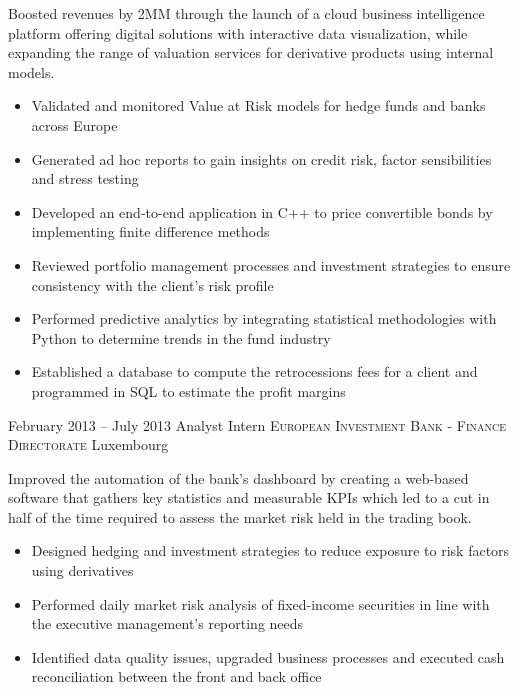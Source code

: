 \documentclass[11pt,a4paper,sans]{moderncv}
\begin{document}
	{
	Boosted revenues by 2MM through the launch of a cloud business intelligence platform offering digital solutions with interactive data visualization, while expanding the range of valuation services for derivative products using internal models.
	\vspace{1mm}
	\begin{itemize}
		\item Validated and monitored Value at Risk models for hedge funds and banks across Europe
		\item Generated ad hoc reports to gain insights on credit risk, factor sensibilities and stress testing
		\item Developed an end-to-end application in C++ to price convertible bonds by implementing finite difference methods
		\item Reviewed portfolio management processes and investment strategies to ensure consistency with the client's risk profile
		\item Performed predictive analytics by integrating statistical methodologies with Python to determine trends in the fund industry
		\item Established a database to compute the retrocessions fees for a client and programmed in SQL to estimate the profit margins
		\vspace{2mm}
	\end{itemize}
	} 
\cventry
	{February 2013 -- July 2013}
	{Analyst Intern}
	{\textsc{European Investment Bank - Finance Directorate}}
	{Luxembourg}{}
	{
	Improved the automation of the bank's dashboard by creating a web-based software that gathers key statistics and measurable KPIs which led to a cut in half of the time required to assess the market risk held in the trading book.
	\vspace{1mm}
	\begin{itemize}
		\item Designed hedging and investment strategies to reduce exposure to risk factors using derivatives
		\item Performed daily market risk analysis of fixed-income securities in line with the executive management's reporting needs
		\item Identified data quality issues, upgraded business processes and executed cash reconciliation between the front and back office
		\vspace{2mm}
	\end{itemize}
	}
\end{document}

